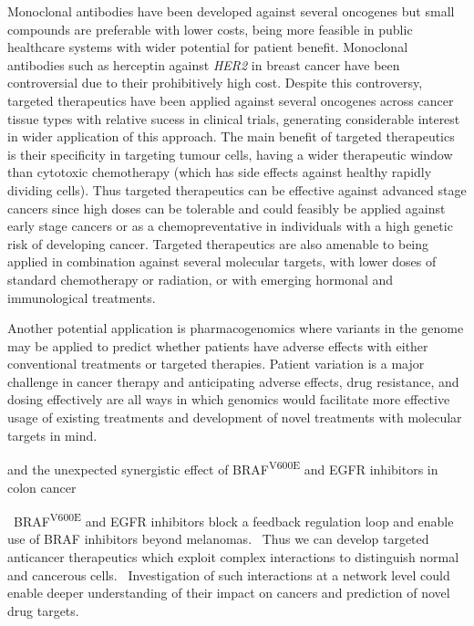 Monoclonal antibodies have been developed against several oncogenes but small compounds are preferable with lower costs, being more feasible in public healthcare systems with wider potential for patient benefit. Monoclonal antibodies such as herceptin against \textit{HER2} in breast cancer have been controversial due to their prohibitively high cost. Despite this controversy, targeted therapeutics have been applied against several oncogenes across cancer tissue types with relative sucess in clinical trials, generating considerable interest in wider application of this approach. The main benefit of targeted therapeutics is their specificity in targeting tumour cells, having a wider therapeutic window than cytotoxic chemotherapy (which has side effects against healthy rapidly dividing cells). Thus targeted therapeutics can be effective against advanced stage cancers since high doses can be tolerable and could feasibly be applied against early stage cancers or as a chemopreventative in individuals with a high genetic risk of developing cancer. Targeted therapeutics are also amenable to being applied in combination against several molecular targets, with lower doses of standard chemotherapy or radiation, or with emerging hormonal and immunological treatments.

Another potential application is pharmacogenomics where variants in the genome may be applied to predict whether patients have adverse effects with either conventional treatments or targeted therapies. Patient variation is a major challenge in cancer therapy and anticipating adverse effects, drug resistance, and dosing effectively are all ways in which genomics would facilitate more effective usage of existing treatments and development of novel treatments with molecular targets in mind.


and the unexpected synergistic effect of BRAF\textsuperscript{V600E} and EGFR inhibitors in colon cancer

\ BRAF\textsuperscript{V600E} and EGFR inhibitors block a feedback regulation loop and enable use of BRAF inhibitors beyond melanomas. \ Thus we can develop targeted anticancer therapeutics which exploit complex interactions to distinguish normal and cancerous cells. \ Investigation of such interactions at a network level could enable deeper understanding of their impact on cancers and prediction of novel drug targets.

